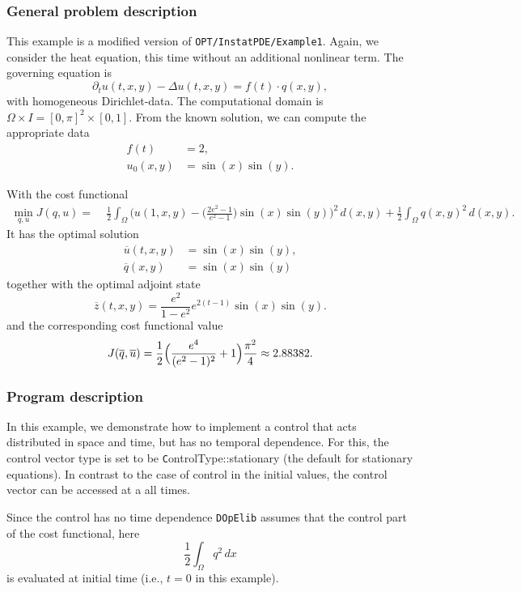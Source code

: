 \subsubsection{General problem description}

This example is a modified version of \texttt{OPT/InstatPDE/Example1}. 
Again, we consider the heat equation, this time without an additional nonlinear
term. The governing equation is
\begin{equation*}
\partial_t u(t,x,y) - \Delta u(t,x,y) = f(t)\cdot q(x,y),
\end{equation*}
with homogeneous Dirichlet-data.
The computational domain is $\Omega \times I = [0,\pi]^2 \times [0,1]$. From the known solution, we can compute the appropriate data 
\begin{align*}
f(t) &= 2,\\
u_0(x,y) &= \sin(x)\sin(y).
\end{align*}

With the cost functional 
\begin{align*}
 \min_{q,u} J(q,u) =&\; \frac{1}{2}\int_{\Omega} \Biggl(u(1,x,y) - \biggl(\frac{2e^2-1}{e^2-1}\biggr)\sin(x) \sin(y)\Biggr)^2\,d(x,y) + \frac{1}{2} \int_{\Omega} q(x,y)^2\,d(x,y).
\end{align*}
It has the optimal solution 
\begin{align*}
\overline{u}(t,x,y) &= \sin(x) \sin(y),\\
\overline{q}(x,y) &= \sin(x) \sin(y)
\end{align*}
together with the optimal adjoint state 
\[
 \overline{z}(t,x,y) = \frac{e^2}{1-e^2}e^{2(t-1)}\sin(x) \sin(y).
\]
and the corresponding cost functional value 
\[
J(\overline{q},\overline{u}) = \frac{1}{2} \Bigl(\frac{e^4}{(e^2-1)^2}+1\Bigr)\frac{\pi^2}{4} \approx 2.88382.
\]


\subsubsection{Program description}
In this example, we demonstrate how to implement a control that acts distributed in space and time,
but has no temporal dependence. For this, the control vector type is set to be 
{\texttt ControlType::stationary} (the default for stationary equations). In contrast to 
the case of control in the initial values, the control vector can be accessed at a 
all times. 

Since the control has no time dependence \texttt{DOpElib} assumes that the control part of 
the cost functional, here 
\[
 \frac{1}{2}\int_\Omega q^2\,dx
\]
is evaluated at initial time (i.e., $t=0$ in this example). 